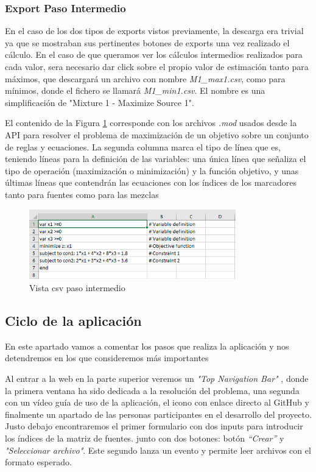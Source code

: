 \subsubsection{Export Paso Intermedio }

En el caso de los dos tipos de exports vistos previamente, la descarga era trivial  ya que se mostraban sus pertinentes botones de exports una vez realizado el cálculo. En el caso de que queramos ver los cálculos intermedios realizados para cada valor, sera necesario dar click sobre el propio valor de estimación tanto para máximos, que descargará un archivo con nombre \textit{M1\_max1.csv}, como para mínimos, donde el fichero se llamará \textit{M1\_min1.csv}. El nombre es una simplificación de "Mixture 1 - Maximize Source 1".

El contenido de la Figura \ref{fig:pasoIntermedio} corresponde con los archivos \textit{.mod} usados desde la API para resolver el problema de maximización de un objetivo sobre un conjunto de reglas y ecuaciones. La segunda columna  marca el tipo de línea que es, teniendo líneas para la definición de las variables: una  única línea que señaliza el tipo de operación (maximización o minimización) y la función objetivo, y unas últimas líneas que contendrán las ecuaciones con los índices de los marcadores tanto para fuentes como para las mezclas

\begin{figure}[h!] 
\centering
    \includegraphics[width=0.8\textwidth]{img/pasoIntermedio.PNG}
\caption{Vista csv paso intermedio}
\label{fig:pasoIntermedio}
\end{figure}

\newpage
\subsection{Ciclo de la aplicación}

En este apartado vamos a comentar los pasos que realiza la aplicación y nos detendremos en los que consideremos más importantes

Al entrar a la web en la parte superior veremos un \textit{"Top Navigation Bar"} \cite{Navigation:Bar}, donde la primera ventana ha sido dedicada a la resolución del problema, una segunda con un vídeo guía de uso de la aplicación, el icono con enlace directo al GitHub y finalmente un apartado de las personas participantes en el desarrollo del proyecto.
Justo debajo encontraremos el primer formulario con dos inputs para introducir los índices de la matriz de fuentes. junto con dos botones:  botón \textit{``Crear''} y  \textit{"Seleccionar archivo"}. Este segundo lanza un evento y permite leer archivos con el formato esperado.

